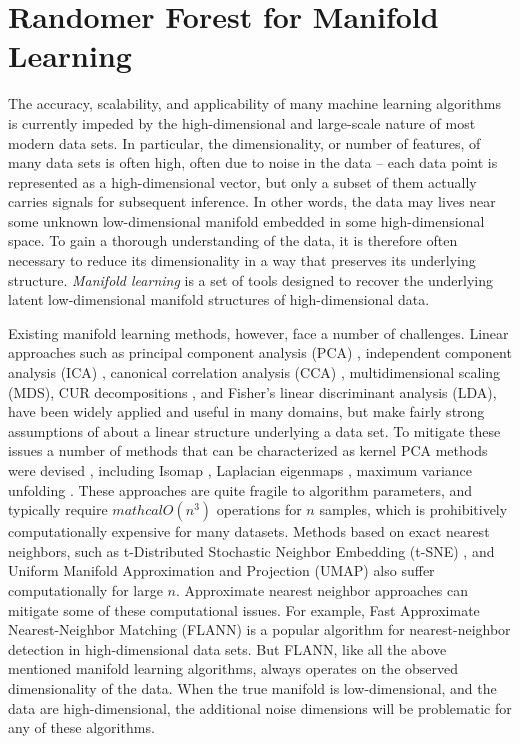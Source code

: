 \section{Randomer Forest for Manifold Learning}
The accuracy, scalability, and applicability of many machine learning algorithms is currently impeded by the high-dimensional and large-scale nature of most modern data sets. In particular, the dimensionality, or number of features, of many data sets is often  high, often due to noise in the data -- each data point is represented as a high-dimensional vector, but only a subset of them actually carries signals for subsequent inference.
In other words, the data may lives near some unknown low-dimensional manifold embedded in some high-dimensional space. 
To gain a thorough understanding of the data, it is therefore often necessary to reduce its dimensionality in a way that preserves its underlying structure. \textit{Manifold learning} is a set of tools designed to recover the underlying latent low-dimensional manifold structures of high-dimensional data.

Existing manifold learning methods, however, face a number of challenges.  Linear approaches such as principal component analysis (PCA) \cite{pearson1901}, independent component analysis (ICA) \cite{hyvarinen2000independent}, canonical correlation analysis (CCA) \cite{hotelling1936relations}, multidimensional scaling (MDS)\cite{cox2000multidimensional}, CUR decompositions \cite{mahoney2009cur}, and Fisher's linear discriminant analysis (LDA), have been widely applied and useful in many domains, but make fairly strong assumptions of about a linear structure underlying a data set. To mitigate these issues a number of methods that can be characterized as kernel PCA methods were devised \cite{scholkopf1997kernel}, including  Isomap \cite{tenenbaum2000global}, Laplacian eigenmaps \cite{belkin2002laplacian}, maximum variance unfolding \cite{weinberger2006unsupervised}. These approaches are quite fragile to algorithm parameters, and typically require $mathcal{O}(n^3)$ operations for $n$ samples, which is prohibitively computationally expensive for many datasets.  Methods based on exact nearest neighbors, such as t-Distributed Stochastic Neighbor Embedding (t-SNE) \cite{maaten2008visualizing}, and
Uniform
Manifold Approximation and Projection (UMAP) \cite{mcinnes2018umap} also suffer computationally for large $n$. Approximate nearest neighbor approaches can mitigate some of these computational issues.  For example, Fast Approximate Nearest-Neighbor Matching (FLANN) \cite{muja2014scalable} is a popular 
algorithm for nearest-neighbor detection in high-dimensional data sets. But FLANN, like all the above mentioned manifold learning algorithms, always operates on the observed dimensionality of the data.  When the true manifold is low-dimensional, and the data are high-dimensional, the additional noise dimensions will be problematic for any of these algorithms.


